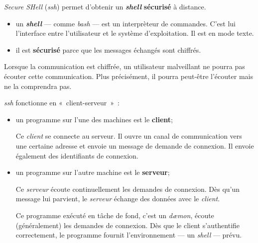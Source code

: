 \documentclass[a4paper,11pt]{article}
\date{2018 -- 2019}
\begin{document}
\entete
\titre
{}
\lastedit

\dosecttoc
\setcounter{tocdepth}{1} 

\renewcommand{\contentsname}{}
\tableofcontents

\vspace{2cm}

\emph{Secure SHell} (\emph{ssh}) permet d'obtenir un \textbf{\emph{shell}}
\textbf{sécurisé} à distance.

\begin{itemize}

	\item un \textbf{\emph{shell}} --- comme \emph{bash} --- est un interprèteur
		de commandes. C'est lui l'interface entre l'utilisateur et le système
		d'exploitation. Il est en mode texte.

	\item il est \textbf{sécurisé} parce que les messages échangés sont
		chiffrés.  \end{itemize}

Lorsque la communication est chiffrée, un utilisateur malveillant ne
pourra pas écouter cette communication. Plus précisément, il pourra
peut-être l'écouter mais ne la comprendra pas.

\emph{ssh} fonctionne en «~client-serveur~»~:

\begin{itemize}

	\item un programme sur l'une des machines est le \textbf{client};

		Ce \emph{client} se connecte au serveur. Il ouvre un canal de
		communication vers une certaine adresse et envoie un message de demande
		de connexion. Il envoie également des identifiants de connexion.  

	\item un programme sur l'autre machine est le \textbf{serveur};

		Ce \emph{serveur} écoute continuellement les demandes de connexion.  Dès
		qu'un message lui parvient, le \emph{serveur} échange des données avec
		le \emph{client}.

		Ce programme exécuté en tâche de fond, c'est un \emph{dæmon}, écoute
		(généralement) les demandes de connexion. Dès que le client
		s'authentifie correctement, le programme fournit l'environnement --- un
		\emph{shell} --- prévu.

\end{itemize}
\end{document}
